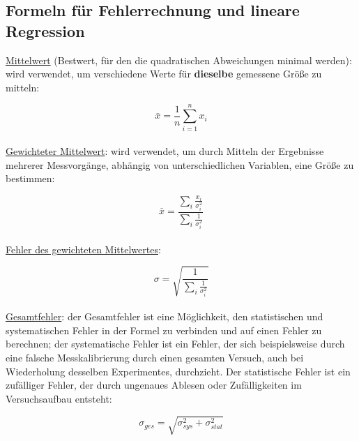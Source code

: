 \subsection{Formeln für Fehlerrechnung und lineare Regression}
    \label{subsec:fehlerformeln}
        
    \underline{Mittelwert} (Bestwert, für den die quadratischen Abweichungen minimal werden): wird verwendet, 
    um verschiedene Werte für \textbf{dieselbe} gemessene Größe zu mitteln:
    
    \begin{equation}
        \bar{x}=\frac{1}{n} \overset{n}{\underset{i=1}{\sum}} x_i
        \label{eq:mittelwert}
    \end{equation}
    \\

    \underline{Gewichteter Mittelwert}: wird verwendet, um durch Mitteln der Ergebnisse mehrerer Messvorgänge, 
    abhängig von unterschiedlichen Variablen, eine Größe zu bestimmen:

    \begin{equation}
        \bar{x} = \frac{\underset{i}{\sum }\frac{x_i}{\sigma_i^2}}{\underset{i}{\sum }\frac{1}{\sigma_i^2}}
        \label{eq:gewichtetermittelwert}
    \end{equation}
    \\

    \underline{Fehler des gewichteten Mittelwertes}:

    \begin{equation}
        \sigma = \sqrt{\frac{1}{\underset{i}{\sum}\frac{1}{\sigma_i^2}}}
        \label{eq:fehlergewmi}
    \end{equation}
    \\

    \underline{Gesamtfehler}: der Gesamtfehler ist eine Möglichkeit, den statistischen und systematischen Fehler 
    in der Formel zu verbinden und auf einen Fehler zu berechnen; der systematische Fehler ist ein Fehler, der sich 
    beispielsweise durch eine falsche Messkalibrierung durch einen gesamten Versuch, auch bei Wiederholung desselben 
    Experimentes, durchzieht. Der statistische Fehler ist ein zufälliger Fehler, der durch ungenaues Ablesen oder 
    Zufälligkeiten im Versuchsaufbau entsteht:

    \begin{equation}
        \sigma_{ges} =\sqrt{\sigma_{sys}^2+\sigma_{stat}^2}
        \label{eq:Gesamtfehler}
    \end{equation}


